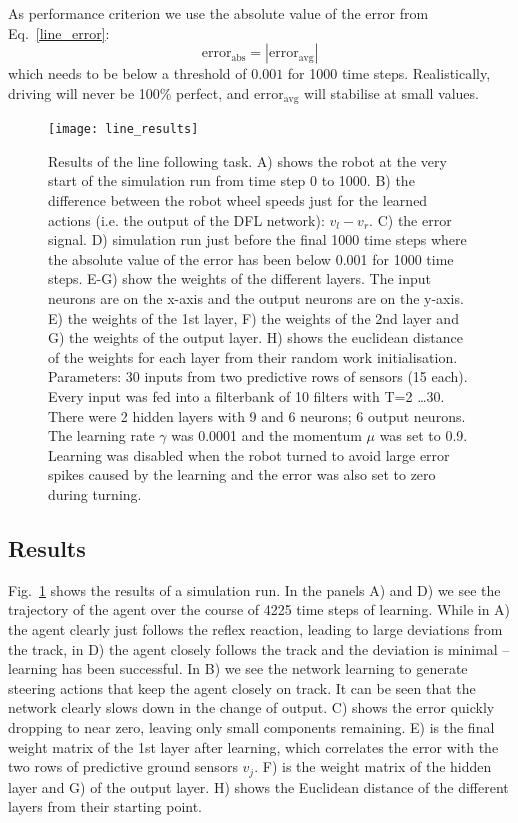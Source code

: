 \documentclass{aamas2018}
\begin{document}
As performance criterion we use the absolute value of the error from
Eq.~\ref{line_error}:
\begin{equation}
  \mathrm{error}_\mathrm{abs} =  |\mathrm{error}_\mathrm{avg}| \label{line_sqerr}
\end{equation}
which needs to be below a threshold of $0.001$ for 1000 time steps.
Realistically, driving will never be 100\% perfect, and $\mathrm{error}_\mathrm{avg}$
will stabilise at small values.


\begin{figure}[!ht]
  \centering
  \texttt{[image: line\_results]}
  \caption{Results of the line following task. A) shows the robot at
    the very start of the simulation run from time step 0 to 1000. B)
    the difference between the robot wheel speeds just for the learned
    actions (i.e. the output of the DFL network): $v_l-v_r$.  C) the
    error signal.  D) simulation run just before the final 1000 time
    steps where the absolute value of the error has been below 0.001
    for 1000 time steps. E-G) show the weights of the different
    layers. The input neurons are on the x-axis and the output neurons
    are on the y-axis.  E) the weights of the 1st layer, F) the
    weights of the 2nd layer and G) the weights of the output layer.
    H) shows the euclidean distance of the weights for each layer from
    their random work initialisation. Parameters: 30 inputs from two
    predictive rows of sensors (15 each). Every input was fed into a
    filterbank of 10 filters with T=2 \ldots 30. There were 2 hidden
    layers with 9 and 6 neurons; 6 output neurons. The learning rate $\gamma$
    was 0.0001 and the momentum $\mu$ was set to 0.9. Learning was disabled
    when the robot turned to avoid large error spikes caused by the learning
    and the error was also set to zero during turning.
    \label{line_results}}
\end{figure}



\subsection{Results}
Fig.~\ref{line_results} shows the results of a simulation run. In the
panels A) and D) we see the trajectory of the agent over the course of
4225 time steps of learning. While in A) the agent clearly just
follows the reflex reaction, leading to large deviations from the
track, in D) the agent closely follows the track and the deviation is
minimal -- learning has been successful. In B) we see the network
learning to generate steering actions that keep the agent closely on track.
It can be seen that the network clearly slows down in the change of
output.  C) shows the error quickly dropping to near zero, leaving
only small components remaining. E) is the final weight matrix of the
1st layer after learning, which correlates the error with the two rows
of predictive ground sensors $v_j$. F) is the weight matrix of the
hidden layer and G) of the output layer. H) shows the Euclidean
distance of the different layers from their starting point.
\end{document}
